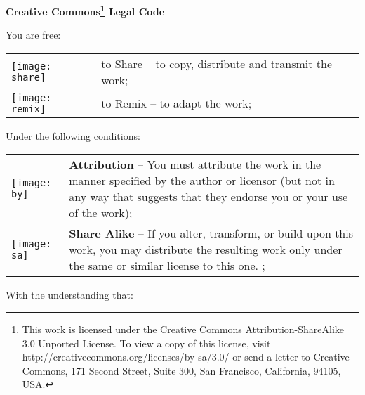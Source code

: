 \begin{center} \textbf{\LARGE{Creative Commons\footnote{
This work is licensed under the Creative Commons Attribution-ShareAlike 3.0 Unported License. To view a copy of this license, visit http://creativecommons.org/licenses/by-sa/3.0/ or send a letter to Creative Commons, 171 Second Street, Suite 300, San Francisco, California, 94105, USA.} Legal Code}} \end{center}
\vspace{1cm}

\large You are free:
\normalsize

\begin{center}
  \begin{tabular}{p{1cm} p{12cm}}
    \texttt{[image: share]} & to Share -- to copy, distribute and transmit the work;\\
    \texttt{[image: remix]} & to Remix -- to adapt the work;\\
  \end{tabular}
\end{center}

\large Under the following conditions:
\normalsize

\begin{center}
  \begin{tabular}{p{1cm} p{12cm}}
    \texttt{[image: by]} & \textbf{Attribution} -- 
    You must attribute the work in the manner specified by the author 
    or licensor (but not in any way that suggests that they endorse you 
    or your use of the work);\\
    \texttt{[image: sa]} & \textbf{Share Alike} --  
    If you alter, transform, or build upon this work, 
    you may distribute the resulting work only under the same 
    or similar license to this one. ;\\
  \end{tabular}
\end{center}

\large With the understanding that:
\normalsize

